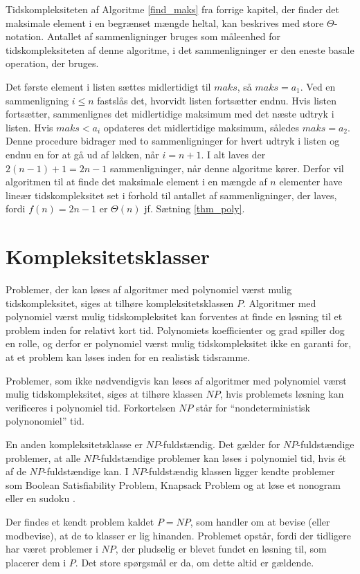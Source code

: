 \begin{exmp}
Tidskompleksiteten af Algoritme \ref{find_maks} fra forrige kapitel, der finder det maksimale element i en begrænset mængde heltal, kan beskrives med store $\Theta$-notation. 
Antallet af sammenligninger bruges som måleenhed for tidskompleksiteten af denne algoritme, i det sammenligninger er den eneste basale operation, der bruges.

Det første element i listen sættes midlertidigt til $maks$, så $maks=a_1$. 
Ved en sammenligning $i \leq n$ fastslås det, hvorvidt listen fortsætter endnu. Hvis listen fortsætter, sammenlignes det midlertidige maksimum med det næste udtryk i listen. 
Hvis $maks<a_i$ opdateres det midlertidige maksimum, således $maks=a_2$.
Denne procedure bidrager med to sammenligninger for hvert udtryk i listen og endnu en for at gå ud af løkken, når $i=n+1$. 
I alt laves der $2(n-1)+1=2n-1$ sammenligninger, når denne algoritme kører. 
Derfor vil algoritmen til at finde det maksimale element i en mængde af $n$ elementer have lineær tidskompleksitet set i forhold til antallet af sammenligninger, der laves, fordi $f(n)=2n-1$ er $\Theta (n)$ jf. Sætning \ref{thm_poly}. 
\label{eks_lin_soeg} 
\end{exmp}

\section{Kompleksitetsklasser}
Problemer, der kan løses af algoritmer med polynomiel værst mulig tidskompleksitet, siges at tilhøre kompleksitetsklassen $P$. 
Algoritmer med polynomiel værst mulig tidskompleksitet kan forventes at finde en løsning til et problem inden for relativt kort tid. 
Polynomiets koefficienter og grad spiller dog en rolle, og derfor er polynomiel værst mulig tidskompleksitet ikke en garanti for, at et problem kan løses inden for en realistisk tidsramme.

Problemer, som ikke nødvendigvis kan løses af algoritmer med  polynomiel værst mulig tidskompleksitet, siges at tilhøre klassen $NP$, hvis problemets løsning kan verificeres i polynomiel tid. Forkortelsen $NP$ står for “nondeterministisk polynonomiel” tid. 

En anden kompleksitetsklasse er $NP$-fuldstændig.
Det gælder for $NP$-fuldstændige problemer, at alle $NP$-fuldstændige problemer kan løses i polynomiel tid, hvis ét af de $NP$-fuldstændige kan.
I $NP$-fuldstændig klassen ligger kendte problemer som Boolean Satisfiability Problem, Knapsack Problem og at løse et nonogram \citep{computers} eller en sudoku \citep{sudoku}.

Der findes et kendt problem kaldet $P=NP$, som handler om at bevise (eller modbevise), at de to klasser er lig hinanden.
Problemet opstår, fordi der tidligere har været problemer i $NP$, der pludselig er blevet fundet en løsning til, som placerer dem i $P$.
Det store spørgsmål er da, om dette altid er gældende.
